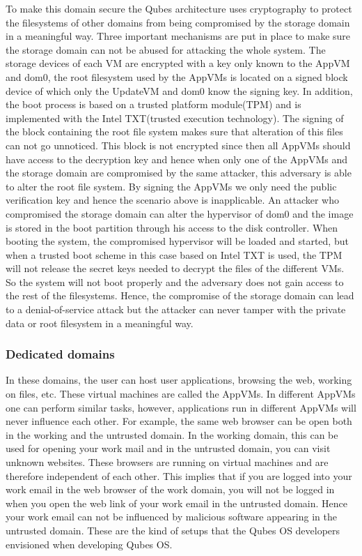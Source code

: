 \documentclass[runningheads,a4paper]{article}
\begin{document}
To make this domain secure the Qubes architecture uses cryptography to
protect the filesystems of other domains from being compromised by the
storage domain in a meaningful way. Three important mechanisms are put
in place to make sure the storage domain can not be abused for
attacking the whole system. The storage devices of each VM are
encrypted with a key only known to the AppVM and dom0, the root
filesystem used by the AppVMs is located on a signed block device of
which only the UpdateVM and dom0 know the signing key. In addition, the boot
process is based on a trusted platform module(TPM) and is implemented
with the Intel TXT(trusted execution technology). The signing of the
block containing the root file system makes sure that alteration of
this files can not go unnoticed. This block is not encrypted since
then all AppVMs should have access to the decryption key and hence
when only one of the AppVMs and the storage domain are compromised by
the same attacker, this adversary is able to alter the root file
system. By signing the AppVMs we only need the public verification key
and hence the scenario above is inapplicable. An attacker who
compromised the storage domain can alter the hypervisor of dom0 and the image is 
stored in the boot partition through his access to the disk
controller. When booting the system, the compromised hypervisor will be
loaded and started, but when a trusted boot scheme in this case based
on Intel TXT is used, the TPM will not release the secret keys needed
to decrypt the files of the different VMs. So the system will not boot
properly and the adversary does not gain access to the rest of the
filesystems. Hence, the compromise of the storage domain can lead to a
denial-of-service attack but the attacker can never tamper with the
private data or root filesystem in a meaningful way.

\subsubsection{Dedicated domains}

In these domains, the user can host user applications, browsing the
web, working on files, etc. These virtual machines are called the
AppVMs. In different AppVMs one can perform similar tasks, however, applications run in different AppVMs will never influence each other. 
For example, the same web browser can be
open both in the working and the untrusted domain. In the working
domain, this can be used for opening your work mail and in the
untrusted domain, you can visit unknown websites. These browsers are
running on virtual machines and are therefore independent of each
other. This implies that if you are logged into your work email in
the web browser of the work domain, you will not be logged in when you
open the web link of your work email in the untrusted domain. Hence
your work email can not be influenced by malicious software appearing
in the untrusted domain. These are the kind of setups that the Qubes
OS developers envisioned when developing Qubes OS.
\end{document}
